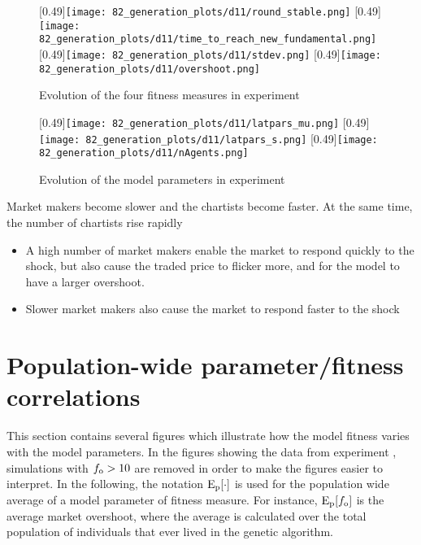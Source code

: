 \begin{figure}
	\centering
	[0.49\linewidth]{\texttt{[image: 82\_generation\_plots/d11/round\_stable.png]}}
	[0.49\linewidth]{\texttt{[image: 82\_generation\_plots/d11/time\_to\_reach\_new\_fundamental.png]}}
	[0.49\linewidth]{\texttt{[image: 82\_generation\_plots/d11/stdev.png]}}
	[0.49\linewidth]{\texttt{[image: 82\_generation\_plots/d11/overshoot.png]}}
	\caption{Evolution of the four fitness measures in experiment \deleven}
	\label{fig:d11_evolution_fitness}
\end{figure}


\begin{figure}
	\centering
	[0.49\linewidth]{\texttt{[image: 82\_generation\_plots/d11/latpars\_mu.png]}}
	[0.49\linewidth]{\texttt{[image: 82\_generation\_plots/d11/latpars\_s.png]}}
	[0.49\linewidth]{\texttt{[image: 82\_generation\_plots/d11/nAgents.png]}}
	\caption{Evolution of the model parameters in experiment \deleven}
	\label{fig:d11_evolution_parameters}
\end{figure}

Market makers become slower and the chartists become faster. At the same time, the number of chartists rise rapidly



\begin{itemize}
\item A high number of market makers enable the market to respond quickly to the shock, but also cause the traded price to flicker more, and for the model to have a larger overshoot.
\item Slower market makers also cause the market to respond faster to the shock
\end{itemize}


\section{Population-wide parameter/fitness correlations}
This section contains several figures which illustrate how the model fitness varies with the model parameters. In the figures showing the data from experiment \deleven, simulations with $f_\text{o}>10$ are removed in order to make the figures easier to interpret. In the following, the notation $\mathrm{E}_\text{p}[\cdot]$ is used for the population wide average of a model parameter of fitness measure. For instance, $\mathrm{E}_\text{p}[f_\text{o}]$ is the average market overshoot, where the average is calculated over the total population of individuals that ever lived in the genetic algorithm.

